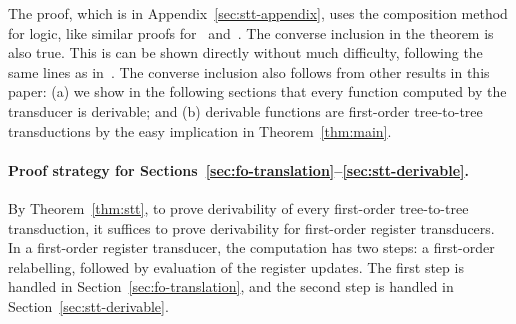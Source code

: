 The proof, which is in Appendix~\ref{sec:stt-appendix}, uses the composition method for logic,  like similar proofs for~\cite[Theorem 4.6]{alur2017streaming} and~\cite[Theorem 14]{bloem_comparison_2000}. 
The converse  inclusion in the  theorem is also true. This is can be shown directly without much difficulty, following the same lines as in~\cite[Section 5]{bloem_comparison_2000}. The converse inclusion also follows from   other results in this paper: (a) we show in the following sections that every function computed by the transducer is derivable; and (b)  derivable functions are first-order tree-to-tree transductions by the easy implication in Theorem~\ref{thm:main}.

\paragraph*{Proof strategy for Sections~\ref{sec:fo-translation}--\ref{sec:stt-derivable}.} By Theorem~\ref{thm:stt}, to prove derivability of  every first-order tree-to-tree transduction, it suffices to prove derivability for first-order register transducers. In a first-order register transducer,  the computation  has two steps: a first-order relabelling, followed by evaluation of the register updates. The first step is handled in Section~\ref{sec:fo-translation}, and the second step is handled in Section~\ref{sec:stt-derivable}.






